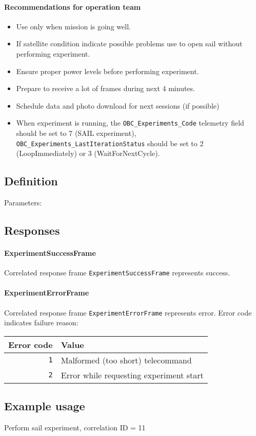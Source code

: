 \paragraph{Recommendations for operation team}
\begin{itemize}
	\item Use only when mission is going well.
	\item If satellite condition indicate possible problems use  to open sail without performing experiment.
	\item Ensure proper power levels before performing experiment.
	\item Prepare to receive a lot of frames during next 4 minutes.
	\item Schedule data and photo download for next sessions (if possible)
	\item When experiment is running, the \texttt{OBC_Experiments_Code} telemetry field should be set to 7 (SAIL experiment), \texttt{OBC_Experiments_LastIterationStatus} should be set to 2 (LoopImmediately) or 3 (WaitForNextCycle).
\end{itemize}


\subsection{Definition}

Parameters: 

\begin{tcarglist}
\end{tcarglist}


\subsection{Responses}

\paragraph{ExperimentSuccessFrame}
Correlated response frame \texttt{ExperimentSuccessFrame} represents success. 

\paragraph{ExperimentErrorFrame}
Correlated response frame \texttt{ExperimentErrorFrame} represents error. Error code indicates failure reason:

\begin{tabular}{r | l}
	Error code & Value \\
	\hline
	\texttt{1} & Malformed (too short) telecommand \\	
	\texttt{2} & Error while requesting experiment start \\	
\end{tabular}


\subsection{Example usage}
Perform sail experiment, correlation ID = 11

